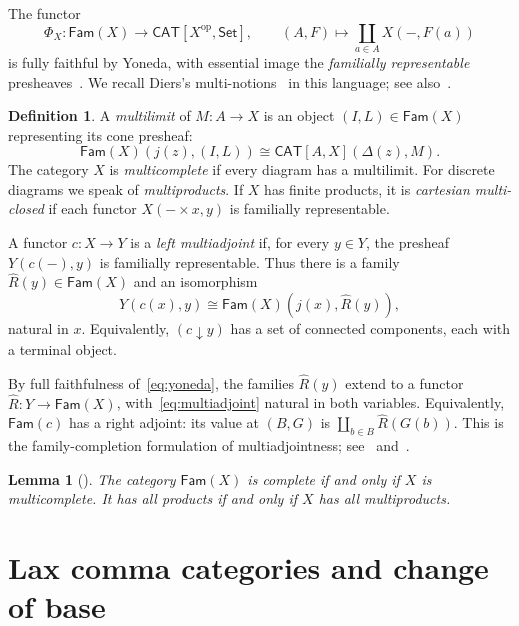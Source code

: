 \documentclass[11pt,a4paper]{amsart}
\newtheorem{lemma}[theorem]{Lemma}
\theoremstyle{definition}
\newtheorem{definition}[theorem]{Definition}
\numberwithin{equation}{section}
\newcommand{\CAT}{\mathsf{CAT}}
\newcommand{\Set}{\mathsf{Set}}
\newcommand{\Fam}{\mathsf{Fam}}
\newcommand{\op}{\mathrm{op}}
\begin{document}
The functor
\begin{equation}\label{eq:yoneda}
 \Phi_X:\Fam(X)\longrightarrow\CAT[X^{\op},\Set],
 \qquad (A,F)\longmapsto\coprod_{a\in A}X(-,F(a))
\end{equation}
is fully faithful by Yoneda, with essential image the \emph{familially representable} presheaves~\cite{CJohnstone}. We recall Diers's multi-notions~\cite{Diers} in this language; see also~\cite{AR,HT}.

\begin{definition}\label{def:multi}
A \emph{multilimit} of $M:A\to X$ is an object $(I,L)\in\Fam(X)$ representing its cone presheaf:
\[
 \Fam(X)(j(z),(I,L))\cong\CAT[A,X](\Delta(z),M).
\]
The category $X$ is \emph{multicomplete} if every diagram has a multilimit. For discrete diagrams we speak of \emph{multiproducts}. If $X$ has finite products, it is \emph{cartesian multi-closed} if each functor $X(-\times x,y)$ is familially representable.

A functor $c:X\to Y$ is a \emph{left multiadjoint} if, for every $y\in Y$, the presheaf $Y(c(-),y)$ is familially representable. Thus there is a family $\widehat R(y)\in\Fam(X)$ and an isomorphism
\begin{equation}\label{eq:multiadjoint}
 Y(c(x),y)\cong\Fam(X)(j(x),\widehat R(y)),
\end{equation}
natural in $x$. Equivalently, $(c\downarrow y)$ has a set of connected components, each with a terminal object.
\end{definition}

By full faithfulness of~\eqref{eq:yoneda}, the families $\widehat R(y)$ extend to a functor $\widehat R:Y\to\Fam(X)$, with~\eqref{eq:multiadjoint} natural in both variables. Equivalently, $\Fam(c)$ has a right adjoint: its value at $(B,G)$ is $\coprod_{b\in B}\widehat R(G(b))$. This is the family-completion formulation of multiadjointness; see~\cite[Section~2.6]{AST} and~\cite[Remark~2.7]{AR}.

\begin{lemma}[{\cite[Remark~2.2(1) and Lemma~2.6]{AR}}]\label{lem:multicomplete}
The category $\Fam(X)$ is complete if and only if $X$ is multicomplete. It has all products if and only if $X$ has all multiproducts.
\end{lemma}

\section{Lax comma categories and change of base}\label{sec:diagrams}
\end{document}
